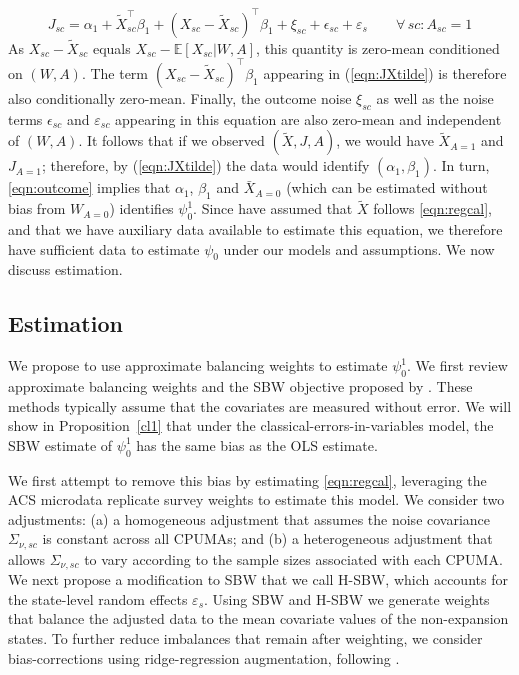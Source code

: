 \documentclass[aoas]{imsart}
\theoremstyle{plain}
\theoremstyle{remark}
\begin{document}
\begin{equation} \label{eqn:JXtilde}
    J_{sc} = \alpha_1 + \tilde{X}_{sc}^\top\beta_1 + (X_{sc} - \tilde{X}_{sc})^\top\beta_1 + \xi_{sc} + \epsilon_{sc} + \varepsilon_s \qquad\forall\, sc: A_{sc} = 1
\end{equation}
As $X_{sc} - \tilde{X}_{sc}$ equals $X_{sc} - \mathbb{E}[X_{sc}|W,A]$, this quantity is zero-mean conditioned on $(W,A)$. The term $(X_{sc} - \tilde{X}_{sc})^\top\beta_1$ appearing in (\ref{eqn:JXtilde}) is therefore also conditionally zero-mean. Finally, the outcome noise $\xi_{sc}$ as well as the noise terms $\epsilon_{sc}$ and $\varepsilon_{sc}$ appearing in this equation are also zero-mean and independent of $(W,A)$. It follows that if we observed $(\tilde{X}, J, A)$, we would have $\tilde{X}_{A=1}$ and $J_{A=1}$; therefore, by (\ref{eqn:JXtilde}) the data would identify $(\alpha_1, \beta_1)$. In turn, \eqref{eqn:outcome} implies that $\alpha_1$, $\beta_1$ and $\bar{X}_{A=0}$ (which can be estimated without bias from $W_{A=0}$) identifies $\psi_0^1$. Since have assumed that $\tilde{X}$ follows \eqref{eqn:regcal}, and that we have auxiliary data available to estimate this equation, we therefore have sufficient data to estimate $\psi_0$ under our models and assumptions. We now discuss estimation.

\subsection{Estimation}\label{ssec:estimation}

We propose to use approximate balancing weights to estimate $\psi_0^1$. We first review approximate balancing weights and the SBW objective proposed by \cite{zubizarreta2015stable}. These methods typically assume that the covariates are measured without error. We will show in Proposition~\ref{cl1} that under the classical-errors-in-variables model, the SBW estimate of $\psi_0^1$ has the same bias as the OLS estimate.

We first attempt to remove this bias by estimating \eqref{eqn:regcal}, leveraging the ACS microdata replicate survey weights to estimate this model. We consider two adjustments: (a) a homogeneous adjustment that assumes the noise covariance $\Sigma_{\nu, sc}$ is constant across all CPUMAs; and (b) a heterogeneous adjustment that allows $\Sigma_{\nu,sc}$ to vary according to the sample sizes associated with each CPUMA. We next propose a modification to SBW that we call H-SBW, which accounts for the state-level random effects $\varepsilon_s$. Using SBW and H-SBW we generate weights that balance the adjusted data to the mean covariate values of the non-expansion states. To further reduce imbalances that remain after weighting, we consider bias-corrections using ridge-regression augmentation, following \cite{ben2021augmented}. 
\end{document}

